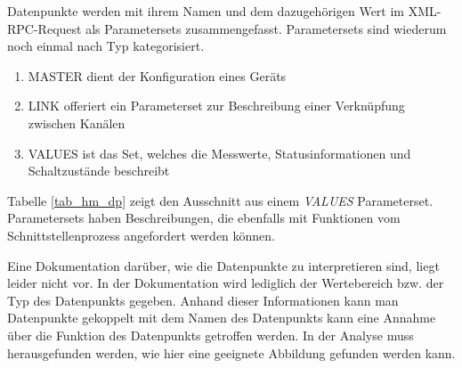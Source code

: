 Datenpunkte werden mit ihrem Namen und dem dazugehörigen Wert im XML-RPC-Request als Parametersets
zusammengefasst.
Parametersets sind wiederum noch einmal nach Typ kategorisiert.
\begin{enumerate}
\item MASTER dient der Konfiguration eines Geräts
\item LINK offeriert ein Parameterset zur Beschreibung einer Verknüpfung zwischen Kanälen
\item VALUES ist das Set, welches die Messwerte, Statusinformationen und Schaltzustände beschreibt
\end{enumerate}
Tabelle \ref{tab_hm_dp} zeigt den Ausschnitt aus einem \emph{VALUES} Parameterset.
Parametersets haben Beschreibungen, die ebenfalls mit Funktionen vom Schnittstellenprozess
angefordert werden können.

Eine Dokumentation darüber, wie die Datenpunkte zu interpretieren sind, liegt leider nicht vor.
In der Dokumentation wird lediglich der Wertebereich bzw. der Typ des Datenpunkts gegeben.
Anhand dieser Informationen kann man Datenpunkte gekoppelt mit dem Namen des Datenpunkts
kann eine Annahme über die Funktion des Datenpunkts getroffen werden.
In der Analyse muss herausgefunden werden, wie hier eine geeignete Abbildung gefunden werden kann.
